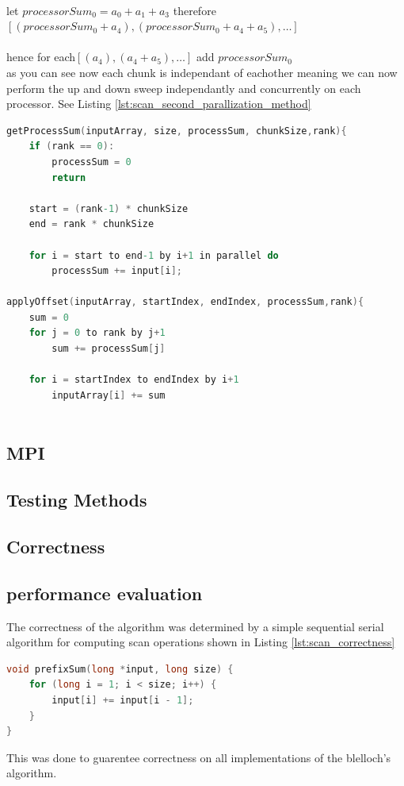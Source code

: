 \\let $processorSum_0 = a_0+a_1+a_3$ therefore\\
$[(processorSum_0+a_4),(processorSum_0 + a_4 +a_5),\dots] $\\\\hence for each$ [(a_4),(a_4 +a_5),\dots]$ add $processorSum_0$\\
as you can see now each chunk is independant of eachother meaning we can now perform the up and down sweep independantly and concurrently on each processor. See Listing \ref{lst:scan_second_parallization_method} 
\begin{lstlisting}[language=C, caption={Serial Sequenctial Scan Algorithm with + operator}, label={lst:scan_second_parallization_method}]
getProcessSum(inputArray, size, processSum, chunkSize,rank){ 
	if (rank == 0):  
		processSum = 0 
		return 
	 
	start = (rank-1) * chunkSize 
	end = rank * chunkSize
	
	for i = start to end-1 by i+1 in parallel do
		processSum += input[i];
	 
applyOffset(inputArray, startIndex, endIndex, processSum,rank){ 
	sum = 0 
	for j = 0 to rank by j+1
		sum += processSum[j] 
		
	for i = startIndex to endIndex by i+1
		inputArray[i] += sum
		
\end{lstlisting}
\subsection{MPI}
\subsection{Testing Methods}

\subsection{Correctness}
\subsection{performance evaluation}
The correctness of the algorithm was determined by a simple sequential serial algorithm for computing scan operations shown in Listing \ref{lst:scan_correctness}
\begin{lstlisting}[language=C, caption={Serial Sequenctial Scan Algorithm with + operator}, label={lst:scan_correctness}]
void prefixSum(long *input, long size) { 
	for (long i = 1; i < size; i++) {
		input[i] += input[i - 1]; 
	} 
}
\end{lstlisting}
This was done to guarentee correctness on all implementations of the blelloch's algorithm.
\pagebreak
